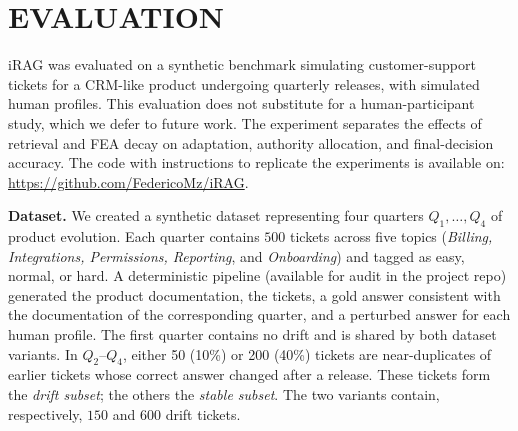 \documentclass[a4paper,twoside]{article}
\begin{document}
\section{\uppercase{Evaluation}}
\label{sec:eval}


iRAG was evaluated on a synthetic benchmark simulating customer-support tickets for a CRM-like product undergoing quarterly releases, with simulated human profiles.
This evaluation does not substitute for a human-participant study, which we defer to future work. The experiment separates the effects of retrieval and FEA decay on adaptation, authority allocation, and final-decision accuracy. The code with instructions to replicate the experiments is available on: \url{https://github.com/FedericoMz/iRAG}.

\textbf{Dataset.}
We created a synthetic dataset representing four quarters $Q_1,\dots,Q_4$ of product evolution. Each quarter contains $500$ tickets across five topics (\textit{Billing, Integrations, Permissions, Reporting}, and \textit{Onboarding}) and tagged as easy, normal, or hard. 
A deterministic pipeline (available for audit in the project repo) generated the product documentation, the tickets, a gold answer consistent with the documentation of the corresponding quarter, and a perturbed answer for each human profile. The first quarter contains no drift and is shared by both dataset variants. In $Q_2$--$Q_4$, either 50 (10\%) or 200 (40\%) tickets are near-duplicates of earlier tickets whose correct answer changed after a release. These tickets form the \textit{drift subset}; the others the \textit{stable subset}. The two variants contain, respectively, $150$ and $600$ drift tickets.
\end{document}

